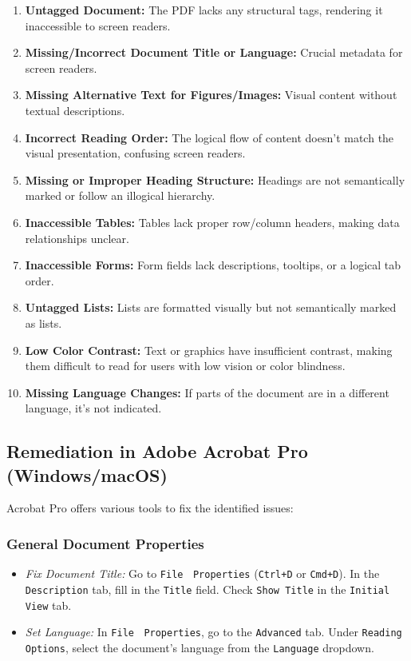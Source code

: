 \begin{enumerate}
\item \textbf{Untagged Document:} The PDF lacks any structural tags, rendering it inaccessible to screen readers. \cite{EquidoxBlog}
\item \textbf{Missing/Incorrect Document Title or Language:} Crucial metadata for screen readers.
\item \textbf{Missing Alternative Text for Figures/Images:} Visual content without textual descriptions.
\item \textbf{Incorrect Reading Order:} The logical flow of content doesn't match the visual presentation, confusing screen readers.
\item \textbf{Missing or Improper Heading Structure:} Headings are not semantically marked or follow an illogical hierarchy.
\item \textbf{Inaccessible Tables:} Tables lack proper row/column headers, making data relationships unclear.
\item \textbf{Inaccessible Forms:} Form fields lack descriptions, tooltips, or a logical tab order.
\item \textbf{Untagged Lists:} Lists are formatted visually but not semantically marked as lists.
\item \textbf{Low Color Contrast:} Text or graphics have insufficient contrast, making them difficult to read for users with low vision or color blindness.
\item \textbf{Missing Language Changes:} If parts of the document are in a different language, it's not indicated.
\end{enumerate}

\subsection{Remediation in Adobe Acrobat Pro (Windows/macOS)}
\label{subsec:remediation-acrobat}
Acrobat Pro offers various tools to fix the identified issues:
\subsubsection{General Document Properties}
\label{subsubsec:doc-properties}

\begin{itemize}
\item \emph{Fix Document Title:} Go to \texttt{File} $\>$ \texttt{Properties} (\texttt{Ctrl+D} or \texttt{Cmd+D}). In the \texttt{Description} tab, fill in the \texttt{Title} field. Check \texttt{Show Title} in the \texttt{Initial View} tab.
\item \emph{Set Language:} In \texttt{File} $\>$ \texttt{Properties}, go to the \texttt{Advanced} tab. Under \texttt{Reading Options}, select the document's language from the \texttt{Language} dropdown.
\end{itemize}


